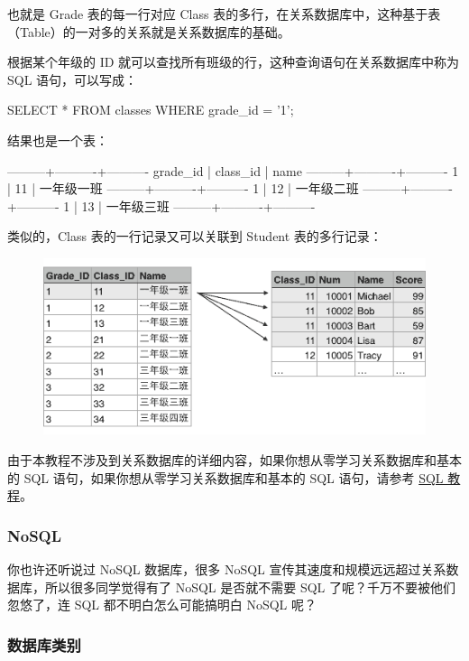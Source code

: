 也就是 Grade 表的每一行对应 Class
表的多行，在关系数据库中，这种基于表（Table）的一对多的关系就是关系数据库的基础。

根据某个年级的 ID 就可以查找所有班级的行，这种查询语句在关系数据库中称为
SQL 语句，可以写成：

\begin{pythoncode}
SELECT * FROM classes WHERE grade_id = '1';
\end{pythoncode}

结果也是一个表：

\begin{pythoncode}
---------+----------+----------
grade_id | class_id | name
---------+----------+----------
1        | 11       | 一年级一班
---------+----------+----------
1        | 12       | 一年级二班
---------+----------+----------
1        | 13       | 一年级三班
---------+----------+----------
\end{pythoncode}

类似的，Class 表的一行记录又可以关联到 Student 表的多行记录：

 
 \begin{figure}[htp]
	\centering
	\includegraphics[width=0.6\linewidth]{fig/9466587096437760.png}
\end{figure}


由于本教程不涉及到关系数据库的详细内容，如果你想从零学习关系数据库和基本的
SQL 语句，如果你想从零学习关系数据库和基本的 SQL 语句，请参考
\href{https://www.liaoxuefeng.com/wiki/1177760294764384}{SQL 教程}。

\hypertarget{nosql}{%
\subsubsection{NoSQL}\label{nosql}}

你也许还听说过 NoSQL 数据库，很多 NoSQL
宣传其速度和规模远远超过关系数据库，所以很多同学觉得有了 NoSQL
是否就不需要 SQL 了呢？千万不要被他们忽悠了，连 SQL
都不明白怎么可能搞明白 NoSQL 呢？

\hypertarget{ux6570ux636eux5e93ux7c7bux522b}{%
\subsubsection{数据库类别}\label{ux6570ux636eux5e93ux7c7bux522b}}

